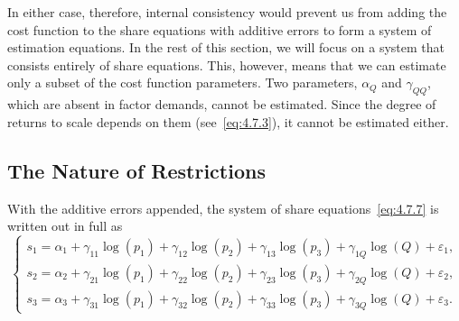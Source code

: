 In either case, therefore, internal consistency would prevent us from adding
the cost function to the share equations with additive errors to form a system of
estimation equations. In the rest of this section, we will focus on a system that
consists entirely of share equations. This, however, means that we can estimate
only a subset of the cost function parameters. Two parameters, $\alpha_Q$ and
$\gamma_{QQ}$, which are absent in factor demands, cannot be estimated.
Since the degree of returns to scale depends on them (see~\eqref{eq:4.7.3}),
it cannot be estimated either.

\subsection*{The Nature of Restrictions}

With the additive errors appended, the system of share equations~\eqref{eq:4.7.7}
is written out in full as
\begin{equation}
\begin{cases}
s_1 = \alpha_1 + \gamma_{11} \log(p_1) + \gamma_{12} \log(p_2)
+ \gamma_{13} \log(p_3) + \gamma_{1Q} \log(Q) + \varepsilon_1, \\
s_2 = \alpha_2 + \gamma_{21} \log(p_1) + \gamma_{22} \log(p_2)
+ \gamma_{23} \log(p_3) + \gamma_{2Q} \log(Q) + \varepsilon_2, \\
s_3 = \alpha_3 + \gamma_{31} \log(p_1) + \gamma_{32} \log(p_2)
+ \gamma_{33} \log(p_3) + \gamma_{3Q} \log(Q) + \varepsilon_3.
\end{cases}
\label{eq:4.7.11}
\end{equation}

